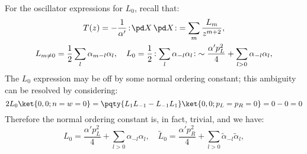 \documentclass[a4paper,10pt]{article}
\begin{document}
\begin{enumerate}
\begin{enumerate}
	For the oscillator expressions for $L_0$, recall that:
	\begin{gather}
		T(z)
		= - \frac{1}{\alpha'}\,
			\normorder{\pd X\,\pd X}
		= \sum_m \frac{L_m}{z^{m+2}},
	\\
		L_{m\ne 0}
		= \frac{1}{2}
			\sum_l \alpha_{m-l} \alpha_l,\quad
		L_0 = \frac{1}{2}\,\normorder{
			\sum_l \alpha_{-l} \alpha_l
		}
		\sim \frac{\alpha'p_L^2}{4}
			+ \sum_{l > 0} \alpha_{-l} \alpha_l,
	\end{gather}
	The $L_0$ expression may be off by some normal ordering constant; this ambiguity can be resolved by considering:
	\begin{equation}
		2L_0 \ket{0,0;n = w = 0}
		= \pqty{
				L_1 L_{-1} - L_{-1} L_1
			} \ket{0,0;p_L = p_R = 0}
		= 0 - 0 = 0
	\end{equation}
	Therefore the normal ordering constant is, in fact, trivial, and we have:
	\begin{equation}
		L_0 = \frac{\alpha'p_L^2}{4}
			+ \sum_{l > 0}
				\alpha_{-l} \alpha_l,\quad
		\tilde{L}_0 = \frac{\alpha'p_R^2}{4}
			+ \sum_{l > 0}
				\tilde{\alpha}_{-l} \tilde{\alpha}_l,
	\end{equation}
	

\end{enumerate}
\end{enumerate}
\end{document}
